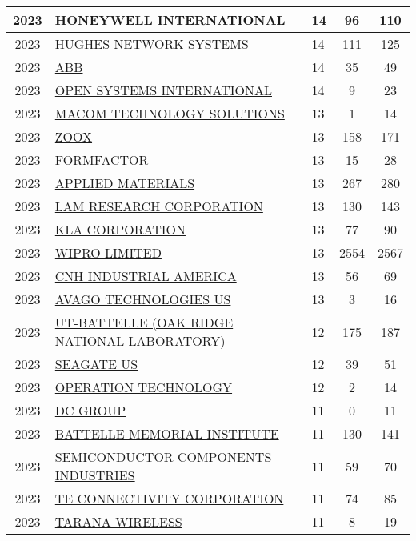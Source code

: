 \documentclass{article}%
\begin{document}
\begin{longtable}{c|p{20em}|p{5em}|c|c}
\hline%
2023&\hyperref[subsec:HONEYWELLINTERNATIONAL]{HONEYWELL INTERNATIONAL}&14&96&110\\%
\hline%
2023&\hyperref[subsec:HUGHESNETWORKSYSTEMS]{HUGHES NETWORK SYSTEMS}&14&111&125\\%
\hline%
2023&\hyperref[subsec:ABB]{ABB}&14&35&49\\%
\hline%
2023&\hyperref[subsec:OPENSYSTEMSINTERNATIONAL]{OPEN SYSTEMS INTERNATIONAL}&14&9&23\\%
\hline%
2023&\hyperref[subsec:MACOMTECHNOLOGYSOLUTIONS]{MACOM TECHNOLOGY SOLUTIONS}&13&1&14\\%
\hline%
2023&\hyperref[subsec:ZOOX]{ZOOX}&13&158&171\\%
\hline%
2023&\hyperref[subsec:FORMFACTOR]{FORMFACTOR}&13&15&28\\%
\hline%
2023&\hyperref[subsec:APPLIEDMATERIALS]{APPLIED MATERIALS}&13&267&280\\%
\hline%
2023&\hyperref[subsec:LAMRESEARCHCORPORATION]{LAM RESEARCH CORPORATION}&13&130&143\\%
\hline%
2023&\hyperref[subsec:KLACORPORATION]{KLA CORPORATION}&13&77&90\\%
\hline%
2023&\hyperref[subsec:WIPROLIMITED]{WIPRO LIMITED}&13&2554&2567\\%
\hline%
2023&\hyperref[subsec:CNHINDUSTRIALAMERICA]{CNH INDUSTRIAL AMERICA}&13&56&69\\%
\hline%
2023&\hyperref[subsec:AVAGOTECHNOLOGIESUS]{AVAGO TECHNOLOGIES US}&13&3&16\\%
\hline%
2023&\hyperref[subsec:UT{-}BATTELLE(OAKRIDGENATIONALLABORATORY)]{UT{-}BATTELLE  (OAK RIDGE NATIONAL LABORATORY)}&12&175&187\\%
\hline%
2023&\hyperref[subsec:SEAGATEUS]{SEAGATE US}&12&39&51\\%
\hline%
2023&\hyperref[subsec:OPERATIONTECHNOLOGY]{OPERATION TECHNOLOGY}&12&2&14\\%
\hline%
2023&\hyperref[subsec:DCGROUP]{DC GROUP}&11&0&11\\%
\hline%
2023&\hyperref[subsec:BATTELLEMEMORIALINSTITUTE]{BATTELLE MEMORIAL INSTITUTE}&11&130&141\\%
\hline%
2023&\hyperref[subsec:SEMICONDUCTORCOMPONENTSINDUSTRIES]{SEMICONDUCTOR COMPONENTS INDUSTRIES}&11&59&70\\%
\hline%
2023&\hyperref[subsec:TECONNECTIVITYCORPORATION]{TE CONNECTIVITY CORPORATION}&11&74&85\\%
\hline%
2023&\hyperref[subsec:TARANAWIRELESS]{TARANA WIRELESS}&11&8&19\\%

\end{longtable}
\end{document}
